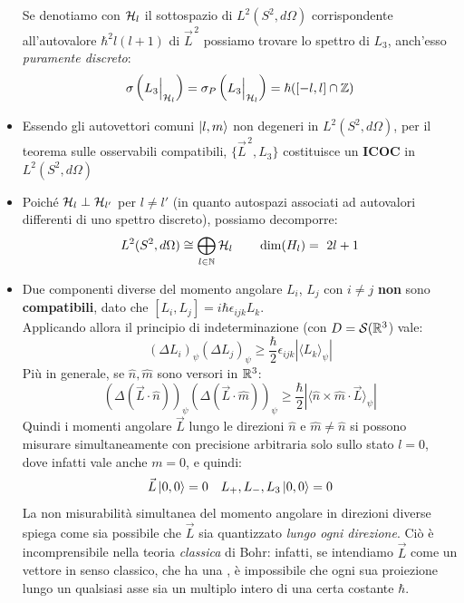 \documentclass[../../FisicaTeorica.tex]{subfiles}
\begin{document}
\begin{itemize}
Se denotiamo con $\mathcal{H}_l$ il sottospazio di $L^2(S^2, d\Omega)$ corrispondente all'autovalore $\hbar^2 l(l+1)$ di $\vec{L}^{\,2}$ possiamo trovare lo spettro di $L_3$, anch'esso \textit{puramente discreto}:
\[
\sigma\left(L_3 \Big|_{\mathcal{H}_l} \right) = \sigma_P\left(L_3 \Big|_{\mathcal{H}_l}\right) = \hbar([-l,l] \cap \mathbb{Z})
\]
\item Essendo gli autovettori comuni $\ket{l,m}$ non degeneri in $L^2(S^2, d\Omega)$, per il teorema sulle osservabili compatibili, $\{\vec{L}^{\,2}, L_3\}$ costituisce un \textbf{ICOC} in $L^2(S^2, d\Omega)$
\item Poiché $\mathcal{H}_l \perp \mathcal{H}_{l'}$ per $l\neq l'$ (in quanto autospazi associati ad autovalori differenti di uno spettro discreto), possiamo decomporre:
\[
L^2(S^2, d\Omega) \cong \bigoplus_{l\in \bb{N}} \hs_l \qquad \op{dim}(H_l) =\ 2l+1
\]
\item Due componenti diverse del momento angolare $L_i$, $L_j$ con $i\neq j$ \textbf{non} sono \textbf{compatibili}, dato che $[L_i, L_j]=i\hbar \epsilon_{ijk} L_k$.\\
Applicando allora il principio di indeterminazione (con $D=\mathcal{S}(\mathbb{R}^3$) vale:
\[
(\Delta L_i)_\psi(\Delta L_j)_\psi \geq \frac{\hbar}{2} \epsilon_{ijk} |\langle L_k \rangle_\psi| 
\]
Più in generale, se $\hat{n}, \hat{m}$ sono versori in $\mathbb{R}^3$:
\[
(\Delta (\vec{L}\cdot \hat{n}))_\psi (\Delta (\vec{L}\cdot \hat{m}))_\psi \geq \frac{\hbar}{2}|\langle \hat{n}\times \hat{m} \cdot \vec{L}\rangle_\psi|
\]
Quindi i momenti angolare $\vec{L}$ lungo le direzioni $\hat{n}$ e $\hat{m}\neq \hat{n}$ si possono misurare simultaneamente con precisione arbitraria solo sullo stato $l=0$, dove infatti vale anche $m=0$, e quindi:
\[
\vec{L}\ket{0,0}=0 \quad L_+, L_-, L_3\ket{0,0}=0
\]
La non misurabilità simultanea del momento angolare in direzioni diverse spiega come sia possibile che $\vec{L}$ sia quantizzato \textit{lungo ogni direzione}. Ciò è incomprensibile nella teoria \textit{classica} di Bohr: infatti, se intendiamo $\vec{L}$ come un vettore in senso classico, che ha una , è impossibile che ogni sua proiezione lungo un qualsiasi asse sia un multiplo intero di una certa costante $\hbar$.
\begin{figure}[H]
\centering

\end{figure}
\end{itemize}
\end{document}
